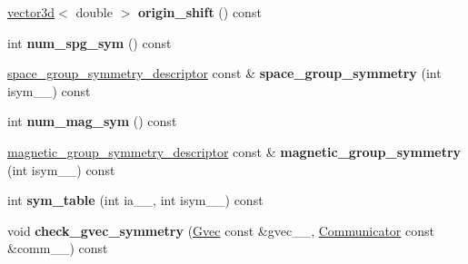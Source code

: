 \begin{DoxyCompactItemize}
\item 
\hypertarget{classsirius_1_1_symmetry_a638f27fa4a506d66ec80650bcfec1f8d}{}\hyperlink{classgeometry3d_1_1vector3d}{vector3d}$<$ double $>$ {\bfseries origin\+\_\+shift} () const \label{classsirius_1_1_symmetry_a638f27fa4a506d66ec80650bcfec1f8d}

\item 
\hypertarget{classsirius_1_1_symmetry_afd4712a5a8335b07955631fad0f1e28a}{}int {\bfseries num\+\_\+spg\+\_\+sym} () const \label{classsirius_1_1_symmetry_afd4712a5a8335b07955631fad0f1e28a}

\item 
\hypertarget{classsirius_1_1_symmetry_a7f547be938e42dcb363c2aa566ca9719}{}\hyperlink{structsirius_1_1space__group__symmetry__descriptor}{space\+\_\+group\+\_\+symmetry\+\_\+descriptor} const \& {\bfseries space\+\_\+group\+\_\+symmetry} (int isym\+\_\+\+\_\+) const \label{classsirius_1_1_symmetry_a7f547be938e42dcb363c2aa566ca9719}

\item 
\hypertarget{classsirius_1_1_symmetry_a1e985f350b70e7ff9ec52ea26a2eac45}{}int {\bfseries num\+\_\+mag\+\_\+sym} () const \label{classsirius_1_1_symmetry_a1e985f350b70e7ff9ec52ea26a2eac45}

\item 
\hypertarget{classsirius_1_1_symmetry_a7fa9f97edcec4f72905b22f60ecd8140}{}\hyperlink{structsirius_1_1magnetic__group__symmetry__descriptor}{magnetic\+\_\+group\+\_\+symmetry\+\_\+descriptor} const \& {\bfseries magnetic\+\_\+group\+\_\+symmetry} (int isym\+\_\+\+\_\+) const \label{classsirius_1_1_symmetry_a7fa9f97edcec4f72905b22f60ecd8140}

\item 
\hypertarget{classsirius_1_1_symmetry_a7e8a1d8b48a39e6966e806e5655f313d}{}int {\bfseries sym\+\_\+table} (int ia\+\_\+\+\_\+, int isym\+\_\+\+\_\+) const \label{classsirius_1_1_symmetry_a7e8a1d8b48a39e6966e806e5655f313d}

\item 
\hypertarget{classsirius_1_1_symmetry_a14d78dfd08d5504800ea559a8b411a1d}{}void {\bfseries check\+\_\+gvec\+\_\+symmetry} (\hyperlink{classsddk_1_1_gvec}{Gvec} const \&gvec\+\_\+\+\_\+, \hyperlink{classsddk_1_1_communicator}{Communicator} const \&comm\+\_\+\+\_\+) const \label{classsirius_1_1_symmetry_a14d78dfd08d5504800ea559a8b411a1d}


\end{DoxyCompactItemize}
